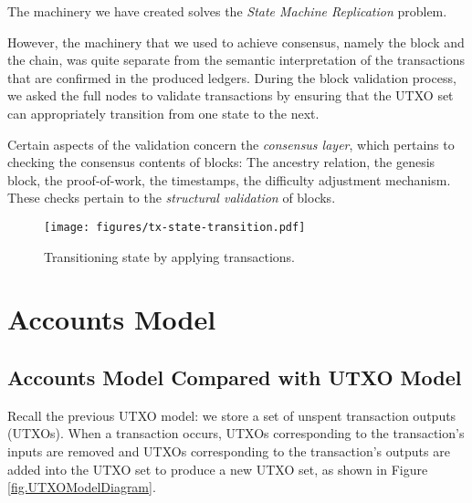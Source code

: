 
The machinery
we have created solves the \emph{State Machine Replication}
problem.

However, the machinery that we used to achieve consensus, namely the block and the chain,
was quite separate from the semantic interpretation of the transactions that are confirmed
in the produced ledgers. During the block validation process, we asked the full nodes
to validate transactions by ensuring that the UTXO set can appropriately transition
from one state to the next.

Certain aspects of the validation concern the \emph{consensus layer},
which pertains to checking the consensus contents of blocks: The ancestry relation,
the genesis block, the proof-of-work, the timestamps, the difficulty adjustment mechanism.
These checks pertain to the \emph{structural validation} of blocks.

\begin{figure}[h]
  \centering
  \texttt{[image: figures/tx-state-transition.pdf]}
  \caption{Transitioning state by applying transactions.}
  \label{fig.state-transition}
\end{figure}

\section{Accounts Model}

\subsection{Accounts Model Compared with UTXO Model}
Recall the previous UTXO model: we store a set of unspent transaction outputs (UTXOs). When a transaction occurs, UTXOs corresponding to the transaction's inputs are removed and UTXOs corresponding to the transaction's outputs are added into the UTXO set to produce a new UTXO set, as shown in Figure \ref{fig.UTXOModelDiagram}.

